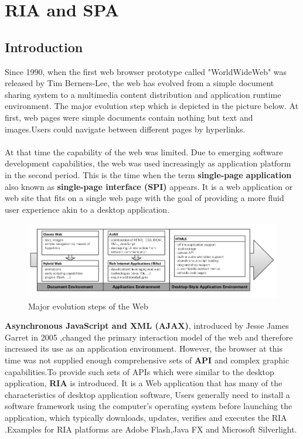 \documentclass[14pt,a4paper]{extreport}
\begin{document}
	\section{RIA and SPA }
		\subsection{Introduction}
	

	
		Since 1990, when the first web browser prototype called "WorldWideWeb"\cite{BL12} was released by Tim Berners-Lee, the web has evolved from a simple document sharing system to a multimedia content distribution and application runtime environment. The major evolution step which is depicted in the picture below. At first, web pages were simple documents contain nothing but text and images.Users could navigate between different pages by hyperlinks.\\\\
		
		 At that time the capability of the web was limited. Due to emerging software development capabilities, the web was used increasingly as application platform in the second period. This is the time when the term \textbf{single-page application} also known as \textbf{single-page interface (SPI)} appears. It is a web application or web site that fits on a single web page with the goal of providing a more fluid user experience akin to a desktop application.
		 
		\begin{figure}[ht]
		 \begin{center}
			\includegraphics[scale=0.5]{WebEvolve.png}
			\caption{Major evolution steps of the Web\cite{TM11}}
		\end{center}
		\end{figure}

		
		\textbf{Asynchronous JavaScript and XML (AJAX)}, introduced by Jesse James Garret in 2005\cite{Gar05} ,changed the primary interaction model of the web and therefore increased its use as an application environment. However, the browser at this time was not supplied enough comprehensive sets of \textbf{API} and complex graphic capabilities.To provide such sets of APIs which were similar to the desktop application, \textbf{RIA} is introduced. It is a Web application that has many of the characteristics of desktop application software, Users generally need to install a software framework using the computer's operating system before launching the application, which typically downloads, updates, verifies and executes the RIA\cite{RIA} .Examples for RIA
platforms are Adobe Flash,Java FX and Microsoft Silverlight.
		
\end{document}
